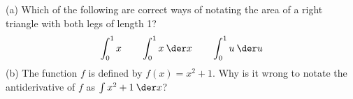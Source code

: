 (a) Which of the following are correct ways of notating the area of a right triangle
with both legs of length 1?
\begin{equation*}
  \int_0^1 x \qquad
  \int_0^1 x\:\der x \qquad
  \int_0^1 u\:\der u 
\end{equation*}
(b) The function $f$ is defined by $f(x)=x^2+1$.
Why is it wrong to notate the antiderivative of $f$ as $\int x^2+1 \:\der x$?

